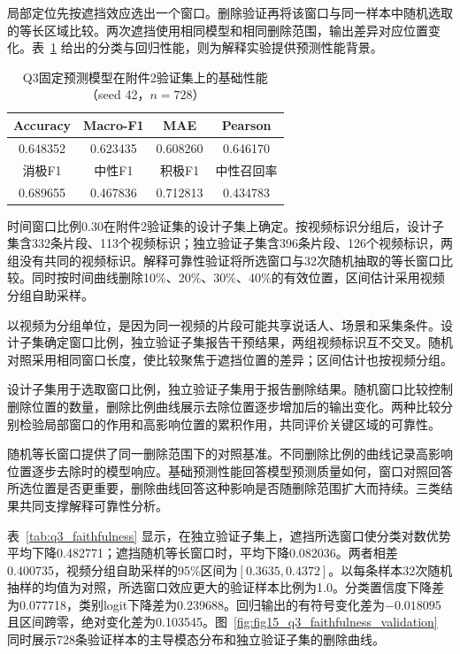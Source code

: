 局部定位先按遮挡效应选出一个窗口。删除验证再将该窗口与同一样本中随机选取的等长区域比较。两次遮挡使用相同模型和相同删除范围，输出差异对应位置变化。表~\ref{tab:q3_predictor} 给出的分类与回归性能，则为解释实验提供预测性能背景。

\begin{table}[htbp]
\centering\small
\setlength{\tabcolsep}{6pt}
\caption{Q3固定预测模型在附件2验证集上的基础性能（seed 42，$n=728$）}
\label{tab:q3_predictor}
\begin{tabular}{@{}cccc@{}}
\toprule
Accuracy & Macro-F1 & MAE & Pearson\\
\midrule
0.648352 & 0.623435 & 0.608260 & 0.646170\\
\midrule
消极F1 & 中性F1 & 积极F1 & 中性召回率\\
\midrule
0.689655 & 0.467836 & 0.712813 & 0.434783\\
\bottomrule
\end{tabular}
\end{table}

时间窗口比例0.30在附件2验证集的设计子集上确定。按视频标识分组后，设计子集含332条片段、113个视频标识；独立验证子集含396条片段、126个视频标识，两组没有共同的视频标识。解释可靠性验证将所选窗口与32次随机抽取的等长窗口比较。同时按时间曲线删除10\%、20\%、30\%、40\%的有效位置，区间估计采用视频分组自助采样。

以视频为分组单位，是因为同一视频的片段可能共享说话人、场景和采集条件。设计子集确定窗口比例，独立验证子集报告干预结果，两组视频标识互不交叉。随机对照采用相同窗口长度，使比较聚焦于遮挡位置的差异；区间估计也按视频分组。

设计子集用于选取窗口比例，独立验证子集用于报告删除结果。随机窗口比较控制删除位置的数量，删除比例曲线展示去除位置逐步增加后的输出变化。两种比较分别检验局部窗口的作用和高影响位置的累积作用，共同评价关键区域的可靠性。

随机等长窗口提供了同一删除范围下的对照基准。不同删除比例的曲线记录高影响位置逐步去除时的模型响应。基础预测性能回答模型预测质量如何，窗口对照回答所选位置是否更重要，删除曲线回答这种影响是否随删除范围扩大而持续。三类结果共同支撑解释可靠性分析。

表~\ref{tab:q3_faithfulness} 显示，在独立验证子集上，遮挡所选窗口使分类对数优势平均下降0.482771；遮挡随机等长窗口时，平均下降0.082036。两者相差0.400735，视频分组自助采样的95\%区间为$[0.3635,0.4372]$。以每条样本32次随机抽样的均值为对照，所选窗口效应更大的验证样本比例为1.0。分类置信度下降差为0.077718，类别logit下降差为0.239688。回归输出的有符号变化差为$-0.018095$且区间跨零，绝对变化差为0.103545。图~\ref{fig:fig15_q3_faithfulness_validation} 同时展示728条验证样本的主导模态分布和独立验证子集的删除曲线。

